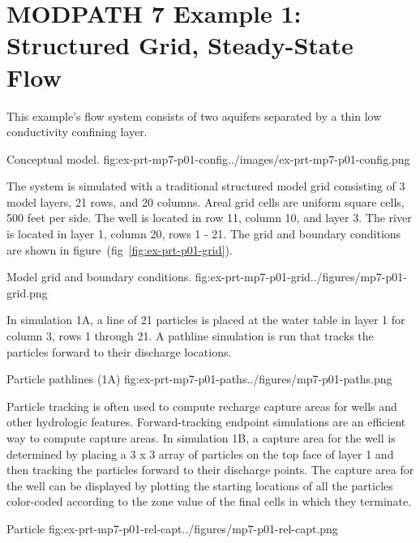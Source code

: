 \section{MODPATH 7 Example 1: Structured Grid, Steady-State Flow}

This example's flow system consists of two aquifers separated by a thin low conductivity confining layer.

\begin{StandardFigure}{
    Conceptual model.
    }{fig:ex-prt-mp7-p01-config}{../images/ex-prt-mp7-p01-config.png}
\end{StandardFigure}

The system is simulated with a traditional structured model grid consisting of 3 model layers, 21 rows, and 20 columns. Areal grid cells are uniform square cells, 500 feet per side. The well is located in row 11, column 10, and layer 3. The river is located in layer 1, column 20, rows 1 - 21. The grid and boundary conditions are shown in figure~(fig~\ref{fig:ex-prt-p01-grid}).

\begin{StandardFigure}{
    Model grid and boundary conditions.
    }{fig:ex-prt-mp7-p01-grid}{../figures/mp7-p01-grid.png}
\end{StandardFigure}

In simulation 1A, a line of 21 particles is placed at the water table in layer 1 for column 3, rows 1 through 21. A pathline simulation is run that tracks the particles forward to their discharge locations.

\begin{StandardFigure}{
    Particle pathlines (1A)
    }{fig:ex-prt-mp7-p01-paths}{../figures/mp7-p01-paths.png}
\end{StandardFigure}

Particle tracking is often used to compute recharge capture areas for wells and other hydrologic features. Forward-tracking endpoint simulations are an efficient way to compute capture areas. In simulation 1B, a capture area for the well is determined by placing a 3 x 3 array of particles on the top face of layer 1 and then tracking the particles forward to their discharge points. The capture area for the well can be displayed by plotting the starting locations of all the particles color-coded according to the zone value of the final cells in which they terminate.

\begin{StandardFigure}{
    Particle 
    }{fig:ex-prt-mp7-p01-rel-capt}{../figures/mp7-p01-rel-capt.png}
\end{StandardFigure}

